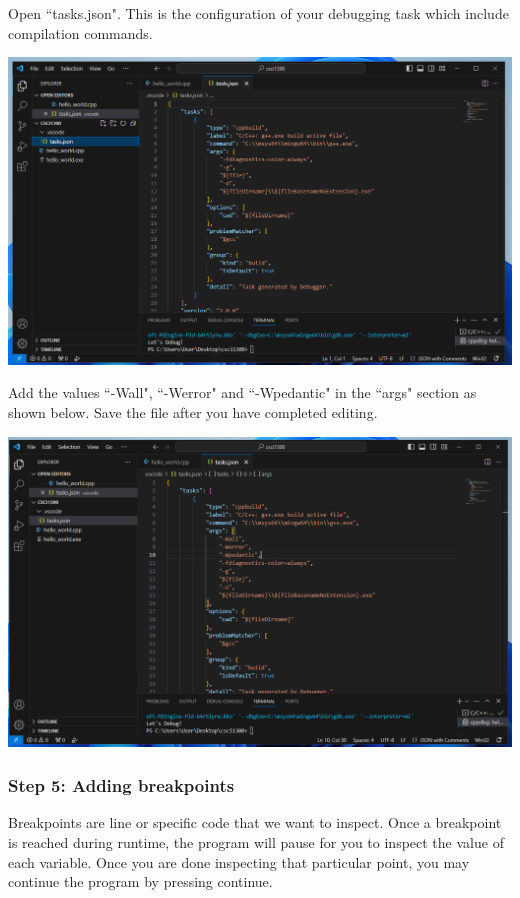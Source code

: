 Open ``tasks.json". This is the configuration of your debugging task which include compilation commands. 

\includegraphics[width=\textwidth]{images/windowsDebuggerSetup/debugger_windows_11.png}

Add the values ``-Wall", ``-Werror" and ``-Wpedantic" in the ``args" section as shown below. Save the file after you have completed editing. 

\includegraphics[width=\textwidth]{images/windowsDebuggerSetup/debugger_windows_12.png}

\subsubsection{Step 5: Adding breakpoints}

Breakpoints are line or specific code that we want to inspect. Once a breakpoint is reached during runtime, the program will pause for you to inspect the value of each variable. Once you are done inspecting that particular point, you may continue the program by pressing continue.

